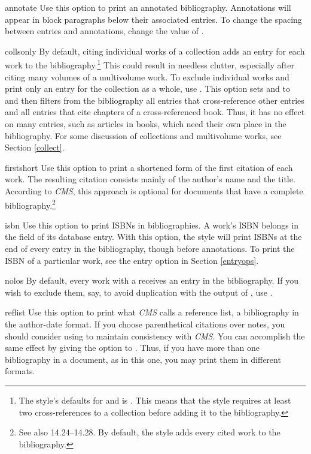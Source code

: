 \documentclass[11pt,letterpaper,oneside]{article}
\begin{document}
\begin{marglist}

\item[annotate] Use this option to print an annotated bibliography.
Annotations will appear in block paragraphs below their associated
entries. To change the spacing between entries and annotations, change
the value of .

\item[collsonly] By default, citing individual works of a collection
adds an entry for each work to the bibliography.\footnote{The style's
defaults for  and  is .
This means that the style requires at least two cross-references to a
collection before adding it to the bibliography.} This could result in
needless clutter, especially after citing many volumes of a
multivolume work. To exclude individual works and print only an entry
for the collection as a whole, use . This option sets
 and  to  and then
filters from the bibliography all  entries that
cross-reference other entries and all  entries
that cite chapters of a cross-referenced book. Thus, it has no effect
on many  entries, such as articles in books,
which need their own place in the bibliography. For some discussion of
collections and multivolume works, see Section \ref{collect}.

\item[firstshort] Use this option to print a shortened form of the
first citation of each work. The resulting citation consists mainly of
the author's name and the title. According to \textit{CMS}, this
approach is optional for documents that have a complete
bibliography.\footnote{\cite[14.14]{chicago2010} See also
14.24--14.28. By default, the style adds every cited work to the
bibliography.}

\item[isbn] Use this option to print ISBNs in bibliographies. A work's
ISBN belongs in the  field of its database entry. With
this option, the style will print ISBNs at the end of every entry in
the bibliography, though before annotations. To print the ISBN of a
particular work, see the  entry option in Section
\ref{entryops}.

\item[nolos] By default, every work with a 
receives an entry in the bibliography. If you wish to exclude them,
say, to avoid duplication with the output of ,
use .

\item[reflist] Use this option to print what \textit{CMS} calls a
reference list, a bibliography in the author-date format. If you
choose parenthetical citations over notes, you should consider using
 to maintain consistency with \textit{CMS}. You can
accomplish the same effect by giving the option  to
. Thus, if you have more than one bibliography
in a document, as in this one, you may print them in different
formats.

\end{marglist}
\end{document}
